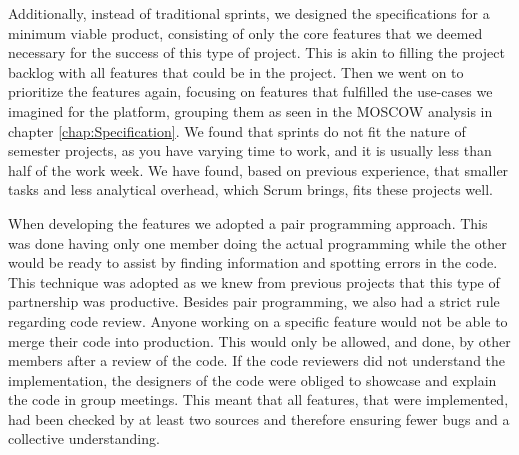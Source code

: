 Additionally, instead of traditional sprints, we designed the specifications for a minimum viable product, consisting of only the core features that we deemed necessary for the success of this type of project. 
This is akin to filling the project backlog with all features that could be in the project. Then we went on to prioritize the features again, focusing on features that fulfilled the use-cases we imagined for the platform, grouping them as seen in the MOSCOW analysis in chapter \ref{chap:Specification}.
We found that sprints do not fit the nature of semester projects, as you have varying time to work, and it is usually less than half of the work week. We have found, based on previous experience, that smaller tasks and less analytical overhead, which Scrum brings, fits these projects well\cite{sutherlandScrumArtDoing2014}.

When developing the features we adopted a pair programming approach. This was done having only one member doing the actual programming while the other would be ready to assist by finding information and spotting errors in the code. This technique was adopted as we knew from previous projects that this type of partnership was productive. Besides pair programming, we also had a strict rule regarding code review. Anyone working on a specific feature would not be able to merge their code into production. This would only be allowed, and done, by other members after a review of the code. If the code reviewers did not understand the implementation, the designers of the code were obliged to showcase and explain the code in group meetings. This meant that all features, that were implemented, had been checked by at least two sources and therefore ensuring fewer bugs and a collective understanding.



